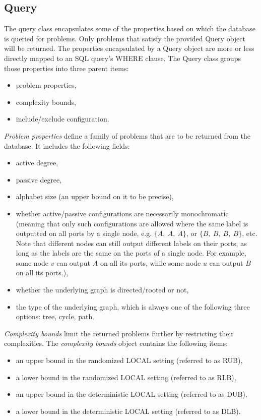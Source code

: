 \subsection{Query}

The query class encapsulates some of the properties
based on which the database is queried for problems.
Only problems that satisfy the provided Query object will be
returned. The properties encapsulated by a Query object are
more or less directly mapped to an SQL query's WHERE clause.
The Query class groups those properties into three parent items:

\begin{itemize}
  \item problem properties,
  \item complexity bounds,
  \item include/exclude configuration.
\end{itemize}

\emph{Problem properties} define a family of problems that are to be
returned from the database. It includes the following fields:

\begin{itemize}
  \item active degree,
  \item passive degree,
  \item alphabet size (an upper bound on it to be precise),
  \item whether active/passive configurations are necessarily monochromatic
  (meaning that only such configurations are allowed where the same label is outputted
  on all ports by a single node, e.g. $\{A,~A,~A\}$, or $\{B,~B,~B,~B\}$, etc.
  Note that different nodes can still output different labels on their ports,
  as long as the labels are the same on the ports of a single node. For example,
  some node $v$ can output $A$
  on all its ports, while some node $u$ can output $B$ on all its ports.),
  \item whether the underlying graph is directed/rooted or not,
  \item the type of the underlying graph, which is always one of the following three
  options: tree, cycle, path.
\end{itemize}

\emph{Complexity bounds} limit the returned problems further by
restricting their complexities. The \emph{complexity bounds} object
contains the following items:

\begin{itemize}
  \item an upper bound in the randomized LOCAL setting (referred to as RUB),
  \item a lower bound in the randomized LOCAL setting (referred to as RLB),
  \item an upper bound in the deterministic LOCAL setting (referred to as DUB),
  \item a lower bound in the deterministic LOCAL setting (referred to as DLB).
\end{itemize}

